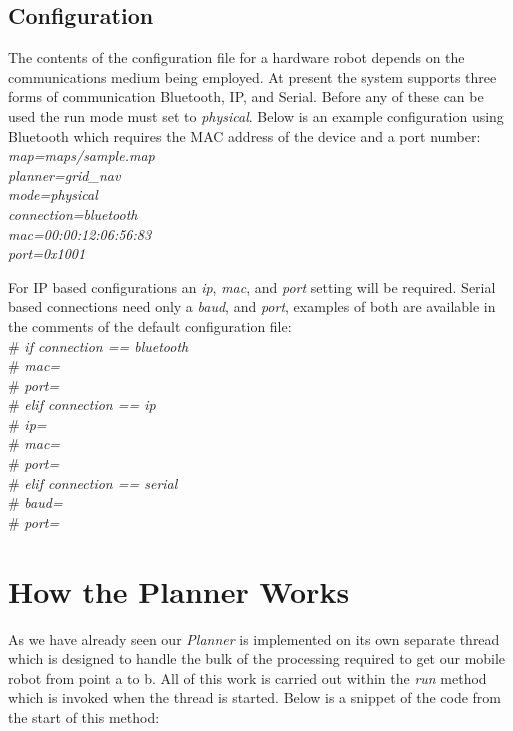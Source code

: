 \subsection{Configuration}
\noindent
The contents of the configuration file for a hardware robot depends on the communications medium being employed. At present the system supports three forms of communication Bluetooth, IP, and Serial. Before any of these can be used the run mode must set to \textit{physical}. Below is an example configuration using Bluetooth which requires the MAC address of the device and a port number: \\

	\indent \textit{map=maps/sample.map\\}
	\indent \textit{planner=grid\_nav\\}
	\indent \textit{mode=physical\\}
	\indent \textit{connection=bluetooth\\}
	\indent \textit{mac=00:00:12:06:56:83\\}
	\indent \textit{port=0x1001}
	
\noindent 
For IP based configurations an \textit{ip}, \textit{mac}, and \textit{port} setting will be required. Serial based connections need only a \textit{baud}, and \textit{port}, examples of both are available in the comments of the default configuration file: \\

	\indent \#   	\textit{if connection == bluetooth\\}
	\indent \#		\indent \textit{mac=\\}
	\indent \#      \indent \textit{port=\\}
	\indent \#   	\textit{elif connection == ip\\}
	\indent \#      \indent \textit{ip=\\}
	\indent \#      \indent \textit{mac=\\}
	\indent \#      \indent \textit{port=\\}
	\indent \#   	\textit{elif connection == serial\\}
	\indent \#      \indent \textit{baud=\\}
	\indent \#      \indent \textit{port=}


\section{How the Planner Works}
\noindent
As we have already seen our \textit{Planner} is implemented on its own separate thread which is designed to handle the bulk of the processing required to get our mobile robot from point a to b. All of this work is carried out within the \textit{run} method which is invoked when the thread is started. Below is a snippet of the code from the start of this method: \\

